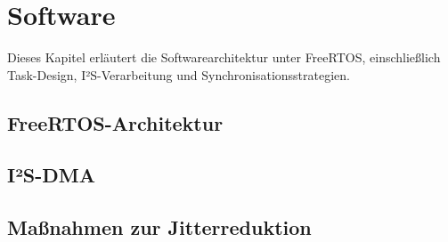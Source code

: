 \section{Software}

Dieses Kapitel erläutert die Softwarearchitektur unter FreeRTOS, einschließlich Task-Design, I²S-Verarbeitung und Synchronisationsstrategien.

\subsection{FreeRTOS-Architektur}


\subsection{I²S-DMA}



\subsection{Maßnahmen zur Jitterreduktion}

